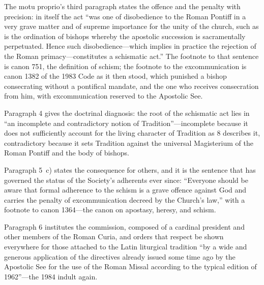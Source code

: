 The motu proprio's third paragraph states the offence and the penalty
with precision: in itself the act ``was one of disobedience to the Roman
Pontiff in a very grave matter and of supreme importance for the unity of
the church, such as is the ordination of bishops whereby the apostolic
succession is sacramentally perpetuated. Hence such disobedience---which
implies in practice the rejection of the Roman primacy---constitutes a
schismatic act.'' The footnote to that sentence is canon 751, the
definition of schism; the footnote to the excommunication is canon 1382
of the 1983 Code as it then stood, which punished a bishop consecrating
without a pontifical mandate, and the one who receives consecration from
him, with excommunication reserved to the Apostolic See.

Paragraph 4 gives the doctrinal diagnosis: the root of the schismatic act
lies in ``an incomplete and contradictory notion of Tradition''---incomplete
because it does not sufficiently account for the living character of
Tradition as  8 describes it, contradictory because it
sets Tradition against the universal Magisterium of the Roman Pontiff and
the body of bishops.

Paragraph 5~c) states the consequence for others, and it is the sentence
that has governed the status of the Society's adherents ever since:
``Everyone should be aware that formal adherence to the schism is a grave
offence against God and carries the penalty of excommunication decreed by
the Church's law,'' with a footnote to canon 1364---the canon on apostasy,
heresy, and schism.

Paragraph 6 institutes the commission, composed of a cardinal president
and other members of the Roman Curia, and orders that respect be shown
everywhere for those attached to the Latin liturgical tradition ``by a
wide and generous application of the directives already issued some time
ago by the Apostolic See for the use of the Roman Missal according to the
typical edition of 1962''---the 1984 indult again.

